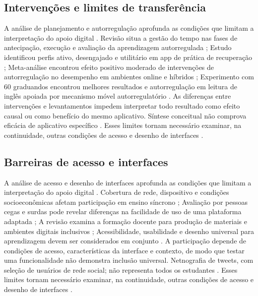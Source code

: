 \clearpage\subsection*{Intervenções e limites de transferência}

A análise de planejamento e autorregulação aprofunda as condições que limitam a interpretação do apoio digital \citep{education_wolters2021} \citep{education_wong2026} \citep{education_xu2022} \citep{education_zheng2016}. Revisão situa a gestão do tempo nas fases de antecipação, execução e avaliação da aprendizagem autorregulada \citep{education_wolters2021}; Estudo identificou perfis ativo, desengajado e utilitário em app de prática de recuperação \citep{education_wong2026}; Meta-análise encontrou efeito positivo moderado de intervenções de autorregulação no desempenho em ambientes online e híbridos \citep{education_xu2022}; Experimento com 60 graduandos encontrou melhores resultados e autorregulação em leitura de inglês apoiada por mecanismo móvel autorregulatório \citep{education_zheng2016}. As diferenças entre intervenções e levantamentos impedem interpretar todo resultado como efeito causal ou como benefício do mesmo aplicativo. Síntese conceitual não comprova eficácia de aplicativo específico \citep{education_wolters2021} \citep{education_wong2026} \citep{education_xu2022} \citep{education_zheng2016}. Esses limites tornam necessário examinar, na continuidade, outras condições de acesso e desenho de interfaces \citep{education_wolters2021} \citep{education_wong2026} \citep{education_xu2022} \citep{education_zheng2016}.

\clearpage\subsection*{Barreiras de acesso e interfaces}

A análise de acesso e desenho de interfaces aprofunda as condições que limitam a interpretação do apoio digital \citep{azionya2021} \citep{batanero2021} \citep{bong2021} \citep{choi2024}. Cobertura de rede, dispositivo e condições socioeconômicas afetam participação em ensino síncrono \citep{azionya2021}; Avaliação por pessoas cegas e surdas pode revelar diferenças na facilidade de uso de uma plataforma adaptada \citep{batanero2021}; A revisão examina a formação docente para produção de materiais e ambientes digitais inclusivos \citep{bong2021}; Acessibilidade, usabilidade e desenho universal para aprendizagem devem ser considerados em conjunto \citep{choi2024}. A participação depende de condições de acesso, características da interface e contexto, de modo que testar uma funcionalidade não demonstra inclusão universal. Netnografia de tweets, com seleção de usuários de rede social; não representa todos os estudantes \citep{azionya2021} \citep{batanero2021} \citep{bong2021} \citep{choi2024}. Esses limites tornam necessário examinar, na continuidade, outras condições de acesso e desenho de interfaces \citep{azionya2021} \citep{batanero2021} \citep{bong2021} \citep{choi2024}.

